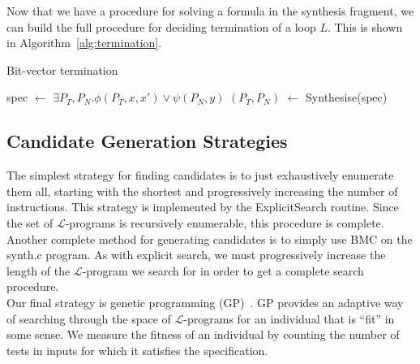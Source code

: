 \documentclass[preprint]{sigplanconf}
\theoremstyle{definition}
\newcommand*\Let[2]{\State #1 $\gets$ #2}
\begin{document}
Now that we have a procedure for solving a formula
in the synthesis fragment, we can build the full procedure for
deciding termination of a loop $L$.  This is shown in Algorithm~\ref{alg:termination}.

\begin{algorithm}
{\small
 \caption{Bit-vector termination
 \label{alg:termination}}
 \vspace{-.5em}
 \begin{algorithmic}[1]
 \Statex
{}
  \Statex  {}
  \Let{spec}{$\exists P_T, P_N. \phi(P_T, x, x') \vee \psi(P_N, y)$}
  \Let{$(P_T, P_N)$}{{\sc Synthesise}(spec)}
    \State {}
    \State {}
  \EndIf
\EndFunction
 \end{algorithmic}
 }
\end{algorithm}



\subsection{Candidate Generation Strategies}
 The simplest strategy for finding candidates
is to just exhaustively enumerate them all, starting with the shortest and
progressively increasing the number of instructions.  This strategy
is implemented by the {\sc ExplicitSearch} routine.  Since the set of
$\mathcal{L}$-programs is recursively enumerable, this procedure is complete.
\\

 Another complete method for generating
candidates is to simply use BMC on the {\sc synth.c} program.  As with explicit
search, we must progressively increase the length of the $\mathcal{L}$-program we search for
in order to get a complete search procedure.
\\

 \label{sec:gp}
Our final strategy is genetic programming
(GP)~\cite{langdon:fogp,brameier2007linear}.  GP provides an adaptive way of
searching through the space of $\mathcal{L}$-programs for an individual
that is ``fit'' in some sense.  We measure the
fitness of an individual by counting the number of tests in {\sc inputs}
for which it satisfies the specification.
\end{document}
